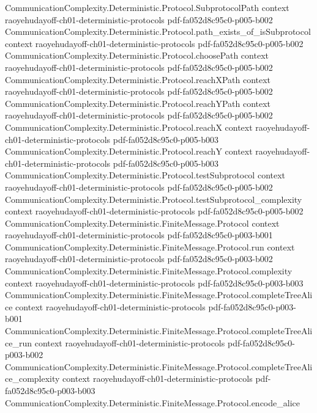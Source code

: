\begin{theorem}
\proofstep
  {CommunicationComplexity.Deterministic.Protocol.SubprotocolPath}
  {context}
  {raoyehudayoff-ch01-deterministic-protocols}
  {pdf-fa052d8c95c0-p005-b002}
\proofstep
  {CommunicationComplexity.Deterministic.Protocol.path_exists_of_isSubprotocol}
  {context}
  {raoyehudayoff-ch01-deterministic-protocols}
  {pdf-fa052d8c95c0-p005-b002}
\proofstep
  {CommunicationComplexity.Deterministic.Protocol.choosePath}
  {context}
  {raoyehudayoff-ch01-deterministic-protocols}
  {pdf-fa052d8c95c0-p005-b002}
\proofstep
  {CommunicationComplexity.Deterministic.Protocol.reachXPath}
  {context}
  {raoyehudayoff-ch01-deterministic-protocols}
  {pdf-fa052d8c95c0-p005-b002}
\proofstep
  {CommunicationComplexity.Deterministic.Protocol.reachYPath}
  {context}
  {raoyehudayoff-ch01-deterministic-protocols}
  {pdf-fa052d8c95c0-p005-b002}
\proofstep
  {CommunicationComplexity.Deterministic.Protocol.reachX}
  {context}
  {raoyehudayoff-ch01-deterministic-protocols}
  {pdf-fa052d8c95c0-p005-b003}
\proofstep
  {CommunicationComplexity.Deterministic.Protocol.reachY}
  {context}
  {raoyehudayoff-ch01-deterministic-protocols}
  {pdf-fa052d8c95c0-p005-b003}
\proofstep
  {CommunicationComplexity.Deterministic.Protocol.testSubprotocol}
  {context}
  {raoyehudayoff-ch01-deterministic-protocols}
  {pdf-fa052d8c95c0-p005-b002}
\proofstep
  {CommunicationComplexity.Deterministic.Protocol.testSubprotocol_complexity}
  {context}
  {raoyehudayoff-ch01-deterministic-protocols}
  {pdf-fa052d8c95c0-p005-b002}
\proofstep
  {CommunicationComplexity.Deterministic.FiniteMessage.Protocol}
  {context}
  {raoyehudayoff-ch01-deterministic-protocols}
  {pdf-fa052d8c95c0-p003-b001}
\proofstep
  {CommunicationComplexity.Deterministic.FiniteMessage.Protocol.run}
  {context}
  {raoyehudayoff-ch01-deterministic-protocols}
  {pdf-fa052d8c95c0-p003-b002}
\proofstep
  {CommunicationComplexity.Deterministic.FiniteMessage.Protocol.complexity}
  {context}
  {raoyehudayoff-ch01-deterministic-protocols}
  {pdf-fa052d8c95c0-p003-b003}
\proofstep
  {CommunicationComplexity.Deterministic.FiniteMessage.Protocol.completeTreeAlice}
  {context}
  {raoyehudayoff-ch01-deterministic-protocols}
  {pdf-fa052d8c95c0-p003-b001}
\proofstep
  {CommunicationComplexity.Deterministic.FiniteMessage.Protocol.completeTreeAlice_run}
  {context}
  {raoyehudayoff-ch01-deterministic-protocols}
  {pdf-fa052d8c95c0-p003-b002}
\proofstep
  {CommunicationComplexity.Deterministic.FiniteMessage.Protocol.completeTreeAlice_complexity}
  {context}
  {raoyehudayoff-ch01-deterministic-protocols}
  {pdf-fa052d8c95c0-p003-b003}
\proofstep
  {CommunicationComplexity.Deterministic.FiniteMessage.Protocol.encode_alice}

\end{theorem}
